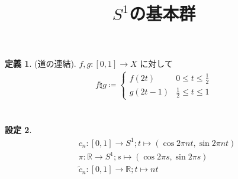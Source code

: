 \documentclass[10pt, fleqn, label-section=none]{bxjsarticle}
\title{$S^1$の基本群}
\date{}
\author{}
\theoremstyle{definition}
\newtheorem{dfn}{定義}[section]
\newtheorem{setting}[dfn]{設定}
\renewcommand{\;}{\, ; \,}
\begin{document}
\maketitle

\section{}



\begin{dfn}(道の連結). $f, g:[0,1] \rightarrow X$ に対して
\begin{align*} f \natural g \coloneqq \begin{cases} f(2t) & 0 \leq t \leq \frac{1}{2} \\ g(2t -1) & \frac{1}{2} \leq t \leq 1 \end{cases} \end{align*}
\end{dfn}



\section{}

\begin{setting}
\begin{align*}
& c_n: [0,1] \rightarrow S^1; t \mapsto (\cos 2 \pi n t, \sin 2 \pi n t) \\ 
& \pi: \mathbb R \rightarrow S^1 ; s \mapsto (\cos 2 \pi s, \sin 2 \pi s) \\
& \tilde c_n : [0, 1] \rightarrow \mathbb R; t \mapsto nt
\end{align*}
\end{setting}
\end{document}
